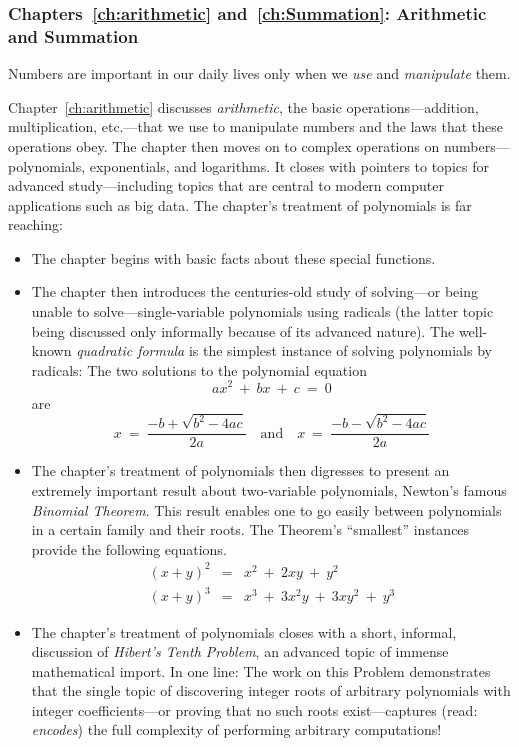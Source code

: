 \subsubsection{Chapters~\ref{ch:arithmetic} and~\ref{ch:Summation}:
Arithmetic and Summation}

Numbers are important in our daily lives only when we {\em use} and
{\em manipulate} them.

Chapter~\ref{ch:arithmetic} discusses {\it arithmetic}, the basic
operations---addition, multiplication, etc.---that we use to
manipulate numbers and the laws that these operations obey.  The
chapter then moves on to complex operations on numbers---polynomials,
exponentials, and logarithms.  It closes with pointers to topics for
advanced study---including topics that are central to modern computer
applications such as big data.  The chapter's treatment of polynomials
is far reaching:
\begin{itemize}
\item
The chapter begins with basic facts about these special functions.
\item
The chapter then introduces the centuries-old study of solving---or
being unable to solve---single-variable polynomials using radicals
(the latter topic being discussed only informally because of its
advanced nature).  The well-known {\it quadratic formula} is the
simplest instance of solving polynomials by radicals: The two
solutions to the polynomial equation
\[ ax^2 \ + \ bx \ + \ c \ = \ 0 \]
are
\[ x \ = \ \frac{-b + \sqrt{b^2 - 4ac}}{2a}
 \ \ \ \mbox{ and } \ \ \
   x \ = \ \frac{-b - \sqrt{b^2 - 4ac}}{2a}
\]
\item
The chapter's treatment of polynomials then digresses to present an
extremely important result about two-variable polynomials, Newton's
famous {\it Binomial Theorem}.  This result enables one to go easily
between polynomials in a certain family and their roots.  The
Theorem's ``smallest'' instances provide the following equations.
\begin{eqnarray*}
(x + y)^2 & = & x^2 \ + \ 2xy \ + \ y^2 \\
(x + y)^3 & = & x^3 \ + \ 3x^2y \ + \ 3 xy^2 \ + \ y^3
\end{eqnarray*}
\item
The chapter's treatment of polynomials closes with a short, informal,
discussion of {\it Hibert's Tenth Problem}, an advanced topic of
immense mathematical import.  In one line: The work on this Problem
demonstrates that the single topic of discovering integer roots of
arbitrary polynomials with integer coefficients---or proving that no
such roots exist---captures (read: {\em encodes}) the full complexity
of performing arbitrary computations!
\end{itemize}
